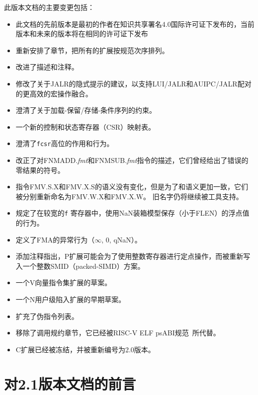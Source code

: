 此版本文档的主要变更包括：
\begin{itemize}
\parskip 0pt
\itemsep 1pt
\item 此文档的先前版本是最初的作者在知识共享署名4.0国际许可证下发布的，当前版本和未来的版本将在相同的许可证下发布
\item 重新安排了章节，把所有的扩展按规范次序排列。
\item 改进了描述和注释。
\item 修改了关于JALR的隐式提示的建议，以支持LUI/JALR和AUIPC/JALR配对的更高效的宏操作融合。
\item 澄清了关于加载-保留/存储-条件序列的约束。
\item 一个新的控制和状态寄存器（CSR）映射表。
\item 澄清了{\tt fcsr}高位的作用和行为。
\item 改正了对FNMADD.{\em fmt}和FNMSUB.{\em fmt}指令的描述，它们曾经给出了错误的零结果的符号。
\item 指令FMV.S.X和FMV.X.S的语义没有变化，但是为了和语义更加一致，它们被分别重新命名为FMV.W.X和FMV.X.W。
      旧名字仍将继续被工具支持。
\item 规定了在较宽的{\tt f} 寄存器中，使用NaN装箱模型保存（小于FLEN）的浮点值的行为。
\item 定义了FMA的异常行为（$\infty$, 0, qNaN）。
\item 添加注释指出，P扩展可能会为了使用整数寄存器进行定点操作，而被重新写入一个整数SMID（packed-SIMD）方案。
\item 一个V向量指令集扩展的草案。
\item 一个N用户级陷入扩展的早期草案。
\item 扩充了伪指令列表。
\item 移除了调用规约章节，它已经被RISC-V ELF psABI规范~\cite{riscv-elf-psabi}所代替。
\item C扩展已经被冻结，并被重新编号为2.0版本。
\end{itemize}

\FloatBarrier

\section*{对2.1版本文档的前言}

